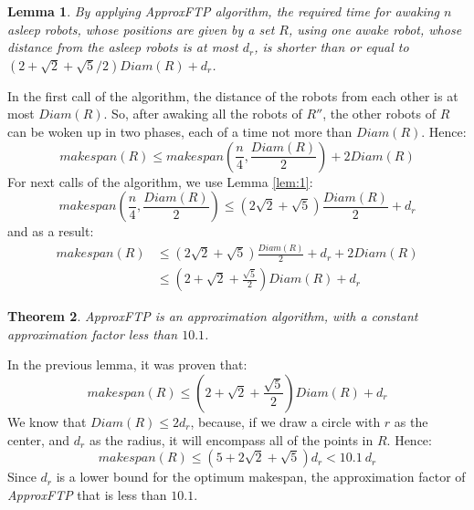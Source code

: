 \documentclass[review]{elsarticle}
\newtheorem{theorem}{Theorem}
\newtheorem{lemma}[theorem]{Lemma}
\def\QED{\ensuremath{{\square}}}
\def\markatright#1{\leavevmode\unskip\nobreak\quad\hspace*{\fill}{#1}}
\newenvironment{proof}
  {\begin{trivlist}\item[\hskip\labelsep{\bf Proof.}]}
  {\markatright{\QED}\end{trivlist}}
\begin{document}
\begin{lemma}
\label{lem:2}
By applying \textit{ApproxFTP} algorithm, the required time for awaking $n$ asleep robots, whose positions are given by a set $R$, using one awake robot, whose distance from the asleep robots is at most $d_r$, is shorter than or equal to ${ (2+\sqrt{2}+\sqrt{5}/2)Diam(R)+d_r }$.
\end{lemma}
\begin{proof}
In the first call of the algorithm, the distance of the robots from each other is at most ${ Diam(R) }$. So, after awaking all the robots of $R''$, the other robots of $R$ can be woken up in two phases, each of a time not more than ${ Diam(R) }$. Hence:
$$ makespan(R) \leq makespan(\frac{n}{4},\frac{Diam(R)}{2})+2Diam(R) $$
For next calls of the algorithm, we use Lemma \ref{lem:1}:
$$ makespan(\frac{n}{4},\frac{Diam(R)}{2}) \leq (2\sqrt{2}+\!\sqrt{5})\frac{Diam(R)}{2}+d_r $$
and as a result:
\begin{align}
makespan(R) &\leq (2\sqrt{2}+\!\sqrt{5})\frac{Diam(R)}{2}+d_r+2 Diam(R) \nonumber\\
			&\leq (2+\sqrt{2}+\frac{\sqrt{5}}{2})Diam(R)+d_r \nonumber
\end{align}
\end{proof}

\begin{theorem}
\textit{ApproxFTP} is an approximation algorithm, with a constant approximation factor less than $10.1$.
\end{theorem}
\begin{proof}
In the previous lemma, it was proven that:
$$ makespan(R) \leq (2+\sqrt{2}+\frac{\sqrt{5}}{2})Diam(R)+d_r $$
We know that ${ Diam(R) \leq 2d_r }$, because, if we draw a circle with $r$ as the center, and $d_r$ as the radius, it will encompass all of the points in $R$. Hence:
$$ makespan(R) \leq (5+2\sqrt{2}+\sqrt{5})d_r < 10.1~d_r $$
Since $d_r$ is a lower bound for the optimum makespan, the approximation factor of \textit{ApproxFTP} that is less than $10.1$.
\end{proof}
\end{document}
